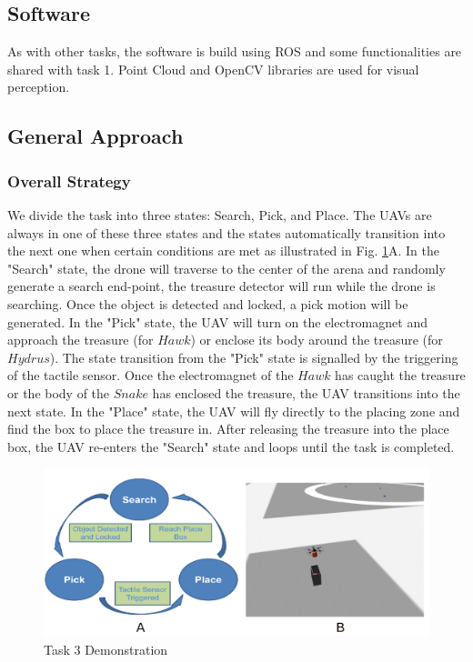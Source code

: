 \documentclass{standalone}
\begin{document}
\subsection{Software}
As with other tasks, the software is build using ROS and some functionalities are shared with task 1. Point Cloud and OpenCV libraries are used for visual perception. %


\subsection{General Approach}
\subsubsection{Overall Strategy}
We divide the task into three states: Search, Pick, and Place. The UAVs are always in one of these three states and the states automatically transition into the next one when certain conditions are met as illustrated in Fig. \ref{t3}A. In the "Search" state, the drone will traverse to the center of the arena and randomly generate a search end-point, the treasure detector will run while the drone is searching. Once the object is detected and locked, a pick motion will be generated. In the "Pick" state, the UAV will turn on the electromagnet and approach the treasure (for $Hawk$) or enclose its body around the treasure (for $Hydrus$). The state transition from the "Pick" state is signalled by the triggering of the tactile sensor. Once the electromagnet of the $Hawk$ has caught the treasure or the body of the $Snake$ has enclosed the treasure, the UAV transitions into the next state. In the "Place" state, the UAV will fly directly to the placing zone and find the box to place the treasure in. After releasing the treasure into the place box, the UAV re-enters the "Search" state and loops until the task is completed.

 \begin{figure}%
    \begin{center}
      \includegraphics[keepaspectratio=true, width=1\linewidth, height=0.30\textheight]{img//task3.png}
    \end{center}
    \caption{Task 3 Demonstration}
    \label{t3}
  \end{figure}
\end{document}
